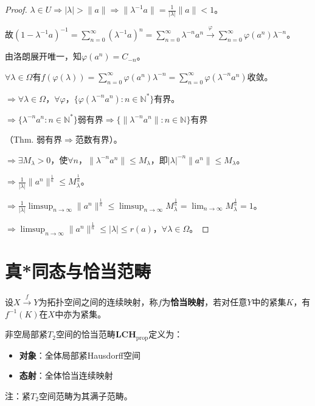 \documentclass[lang=cn,a4paper,newtx,section]{elegantbook}
\begin{document}
\begin{proof}
  $\lambda \in U \Rightarrow |\lambda| > \|a\| \Rightarrow \|\lambda^{-1}a\| = \frac{1}{|\lambda|}\|a\| < 1$。
  
  故$(1 - \lambda^{-1}a)^{-1} = \sum_{n=0}^{\infty}(\lambda^{-1}a)^n = \sum_{n=0}^{\infty}\lambda^{-n}a^n \xrightarrow{\varphi} \sum_{n=0}^{\infty}\varphi(a^n)\lambda^{-n}$。
  
  由洛朗展开唯一，知$\varphi(a^n) = C_{-n}$。
  
  $\forall \lambda \in \Omega$有$f(\varphi(\lambda)) = \sum_{n=0}^{\infty}\varphi(a^n)\lambda^{-n} = \sum_{n=0}^{\infty}\varphi(\lambda^{-n}a^n)$收敛。
  
  $\Rightarrow \forall \lambda \in \Omega$，$\forall \varphi$，$\{\varphi(\lambda^{-n}a^n) : n \in \mathbb{N}^*\}$有界。
  
  $\Rightarrow \{\lambda^{-n}a^n : n \in \mathbb{N}^*\}$弱有界$\Rightarrow \{\|\lambda^{-n}a^n\| : n \in \mathbb{N}\}$有界
  
  （Thm. 弱有界$\Rightarrow$范数有界）。
  
  $\Rightarrow \exists M_\lambda > 0$，使$\forall n$，$\|\lambda^{-n}a^n\| \leq M_\lambda$，即$|\lambda|^{-n}\|a^n\| \leq M_\lambda$。
  
  $\Rightarrow \frac{1}{|\lambda|}\|a^n\|^{\frac{1}{n}} \leq M_\lambda^{\frac{1}{n}}$。
  
  $\Rightarrow \frac{1}{|\lambda|}\limsup_{n \to \infty}\|a^n\|^{\frac{1}{n}} \leq \limsup_{n \to \infty}M_\lambda^{\frac{1}{n}} = \lim_{n \to \infty}M_\lambda^{\frac{1}{n}} = 1$。
  
  $\Rightarrow \limsup_{n \to \infty}\|a^n\|^{\frac{1}{n}} \leq |\lambda|\leq r(a)$，$\forall \lambda \in \Omega$。
  

\end{proof}

\section{真*同态与恰当范畴}

\begin{definition}[恰当映射]
  设$X \xrightarrow{f} Y$为拓扑空间之间的连续映射，称$f$为\textbf{恰当映射}，若对任意$Y$中的紧集$K$，有$f^{-1}(K)$在$X$中亦为紧集。
\end{definition}

\begin{definition}
  非空局部紧$T_2$空间的恰当范畴$\mathbf{LCH}_{\mathrm{prop}}$定义为：
  \begin{itemize}
    \item \textbf{对象}：全体局部紧Hausdorff空间
    \item \textbf{态射}：全体恰当连续映射
  \end{itemize}
  注：紧$T_2$空间范畴为其满子范畴。
\end{definition}
\end{document}
